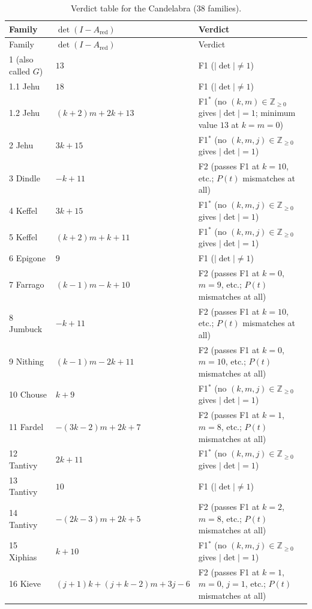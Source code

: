 \begin{longtable}{@{}l l >{\raggedright\arraybackslash}p{}@{}}
\caption{Verdict table for the Candelabra ($38$ families).}\\
\toprule
Family & $\det(I-A_{\text{red}})$ & Verdict \\
\midrule
\endfirsthead
\toprule
Family & $\det(I-A_{\text{red}})$ & Verdict \\
\midrule
\endhead
1 (also called $G$) & $13$ & F1 ($|\det| \neq 1$) \\
1.1 Jehu & $18$ & F1 ($|\det| \neq 1$) \\
1.2 Jehu & $(k+2)m+2k+13$ & F1$^{*}$ (no $(k,m) \in \mathbb{Z}_{\ge 0}$ gives $|\det|=1$; minimum value $13$ at $k=m=0$) \\
2 Jehu & $3k+15$ & F1$^{*}$ (no $(k,m,j) \in \mathbb{Z}_{\ge 0}$ gives $|\det|=1$) \\
3 Dindle & $-k+11$ & F2 (passes F1 at $k = 10$, etc.; $P(t)$ mismatches at all) \\
4 Keffel & $3k+15$ & F1$^{*}$ (no $(k,m,j) \in \mathbb{Z}_{\ge 0}$ gives $|\det|=1$) \\
5 Keffel & $(k+2)m+k+11$ & F1$^{*}$ (no $(k,m,j) \in \mathbb{Z}_{\ge 0}$ gives $|\det|=1$) \\
6 Epigone & $9$ & F1 ($|\det| \neq 1$) \\
7 Farrago & $(k-1)m-k+10$ & F2 (passes F1 at $k = 0$, $m = 9$, etc.; $P(t)$ mismatches at all) \\
8 Jumbuck & $-k+11$ & F2 (passes F1 at $k = 10$, etc.; $P(t)$ mismatches at all) \\
9 Nithing & $(k-1)m-2k+11$ & F2 (passes F1 at $k = 0$, $m = 10$, etc.; $P(t)$ mismatches at all) \\
10 Chouse & $k+9$ & F1$^{*}$ (no $(k,m,j) \in \mathbb{Z}_{\ge 0}$ gives $|\det|=1$) \\
11 Fardel & $-(3k-2)m+2k+7$ & F2 (passes F1 at $k = 1$, $m = 8$, etc.; $P(t)$ mismatches at all) \\
12 Tantivy & $2k+11$ & F1$^{*}$ (no $(k,m,j) \in \mathbb{Z}_{\ge 0}$ gives $|\det|=1$) \\
13 Tantivy & $10$ & F1 ($|\det| \neq 1$) \\
14 Tantivy & $-(2k-3)m+2k+5$ & F2 (passes F1 at $k = 2$, $m = 8$, etc.; $P(t)$ mismatches at all) \\
15 Xiphias & $k+10$ & F1$^{*}$ (no $(k,m,j) \in \mathbb{Z}_{\ge 0}$ gives $|\det|=1$) \\
16 Kieve & $(j+1)k+(j+k-2)m+3j-6$ & F2 (passes F1 at $k = 1$, $m = 0$, $j = 1$, etc.; $P(t)$ mismatches at all) \\

\end{longtable}
